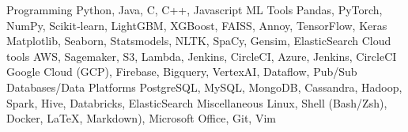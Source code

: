 

\begin{cvskills}
  \cvskill
    {Programming} %
    {Python, Java, C, C++, Javascript}
  \cvskill
    {ML Tools} %
    {Pandas, PyTorch, NumPy, Scikit‑learn, LightGBM, XGBoost, FAISS, Annoy, TensorFlow, Keras} 
 \cvskill
    {} %
    {Matplotlib, Seaborn,  Statsmodels, NLTK, SpaCy, Gensim, ElasticSearch} %
  \cvskill
    {Cloud tools} %
    {AWS, Sagemaker, S3, Lambda, Jenkins, CircleCI, Azure, Jenkins, CircleCI} %
  \cvskill
    {} %
    {Google Cloud (GCP), Firebase, Bigquery, VertexAI,
    Dataflow, Pub/Sub} %
  \cvskill
    {Databases/Data Platforms} %
    {PostgreSQL, MySQL, MongoDB, Cassandra, Hadoop, Spark, Hive, Databricks, ElasticSearch} %
  \cvskill
    {Miscellaneous} %
    {Linux, Shell (Bash/Zsh), Docker, \LaTeX, Markdown), Microsoft Office, Git, Vim} %
\end{cvskills}

